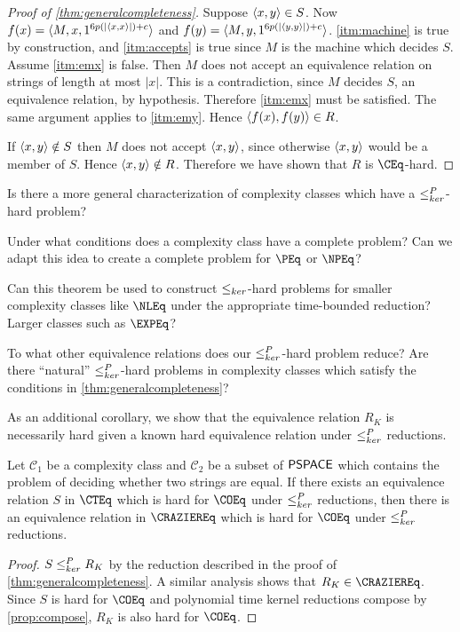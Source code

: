 \begin{proof}[Proof of \autoref{thm:generalcompleteness}]
  Suppose $\langle x,y\rangle\in S$.
  Now $f(x)=\langle M,x,1^{6p(|\langle x,x\rangle|)+c}\rangle$ and $f(y)=\langle M,y,1^{6p(|\langle y,y\rangle|)+c}\rangle$.
  \autoref{itm:machine} is true by construction, and \autoref{itm:accepts} is true since $M$ is the machine which decides $S$.
  Assume \autoref{itm:emx} is false.
  Then $M$ does not accept an equivalence relation on strings of length at most $|x|$.
  This is a contradiction, since $M$ decides $S$, an equivalence relation, by hypothesis.
  Therefore \autoref{itm:emx} must be satisfied.
  The same argument applies to \autoref{itm:emy}.
  Hence $\langle f(x),f(y)\rangle\in R$.

  If $\langle x,y\rangle\notin S$ then $M$ does not accept $\langle x,y\rangle$, since otherwise $\langle x,y\rangle$ would be a member of $S$.
  Hence $\langle x,y\rangle\notin R$.  
  Therefore we have shown that $R$ is $\CEq$-hard.
\end{proof}

\begin{openproblem}
  Is there a more general characterization of complexity classes which have a $\leq^{P}_{ker}$-hard problem?
\end{openproblem}

\begin{openproblem}
  Under what conditions does a complexity class have a complete problem?
  Can we adapt this idea to create a complete problem for $\PEq$ or $\NPEq$?
\end{openproblem}

\begin{openproblem}
  Can this theorem be used to construct $\leq_{ker}$-hard problems for smaller complexity classes like $\NLEq$ under the appropriate time-bounded reduction?
  Larger classes such as $\EXPEq$?
\end{openproblem}

\begin{openproblem}
  To what other equivalence relations does our $\leq^{P}_{ker}$-hard problem reduce?
  Are there ``natural'' $\leq^{P}_{ker}$-hard problems in complexity classes which satisfy the conditions in \autoref{thm:generalcompleteness}?
\end{openproblem}

As an additional corollary, we show that the equivalence relation $R_K$ is necessarily hard given a known hard equivalence relation under $\leq^{P}_{ker}$ reductions.

\begin{corollary}
  Let $\mathcal{C}_1$ be a complexity class and $\mathcal{C}_2$ be a subset of ${\mathsf{PSPACE}}$ which contains the problem of deciding whether two strings are equal.
  If there exists an equivalence relation $S$ in $\CTEq$ which is hard for $\COEq$ under $\leq^{P}_{ker}$ reductions, then there is an equivalence relation in $\CRAZIEREq$ which is hard for $\COEq$ under $\leq^{P}_{ker}$ reductions.
\end{corollary}
\begin{proof}
  $S\leq^{P}_{ker} R_K$ by the reduction described in the proof of \autoref{thm:generalcompleteness}.
  A similar analysis shows that $R_K\in\CRAZIEREq$.
  Since $S$ is hard for $\COEq$ and polynomial time kernel reductions compose by \autoref{prop:compose}, $R_K$ is also hard for $\COEq$.
\end{proof}


